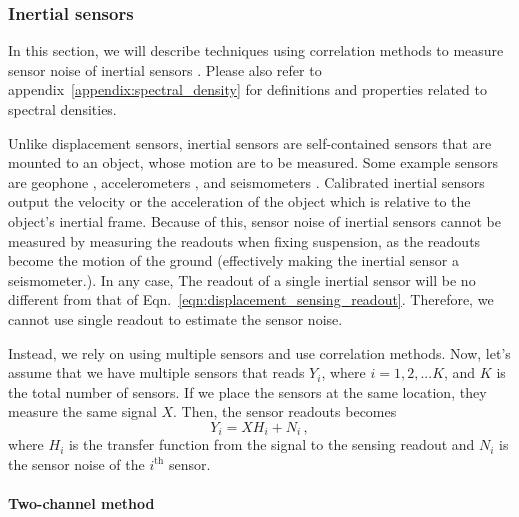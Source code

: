 \subsubsection{Inertial sensors \label{sec:inertial_sensors_baseline}}
In this section, we will describe techniques using correlation methods to measure sensor noise of inertial sensors \cite{technique_for_measurement_of_the_noise, Sleeman2006ThreeChannelCA}. Please also refer to appendix~\ref{appendix:spectral_density} for definitions and properties related to spectral densities.

Unlike displacement sensors, inertial sensors are self-contained sensors that are mounted to an object, whose motion are to be measured.
Some example sensors are geophone \cite{Sekiguchi:2016bmv}, accelerometers \cite{status_of_acc_development_2}, and seismometers \cite{trillium_compact_120-sv1}.
Calibrated inertial sensors output the velocity or the acceleration of the object which is relative to the object's inertial frame.
Because of this, sensor noise of inertial sensors cannot be measured by measuring the readouts when fixing suspension, as the readouts become the motion of the ground (effectively making the inertial sensor a seismometer.).
In any case, The readout of a single inertial sensor will be no different from that of Eqn.~\eqref{eqn:displacement_sensing_readout}.
Therefore, we cannot use single readout to estimate the sensor noise.

Instead, we rely on using multiple sensors and use correlation methods.
Now, let's assume that we have multiple sensors that reads $Y_i$, where $i=1,2,...K$, and $K$ is the total number of sensors.
If we place the sensors at the same location, they measure the same signal $X$.
Then, the sensor readouts becomes
\begin{equation}
	Y_i = XH_i + N_i\,,
	\label{eqn:inertial_sensing_readout}
\end{equation}
where $H_i$ is the transfer function from the signal to the sensing readout and $N_i$ is the sensor noise of the $i^\mathrm{th}$ sensor.

\paragraph{Two-channel method}

